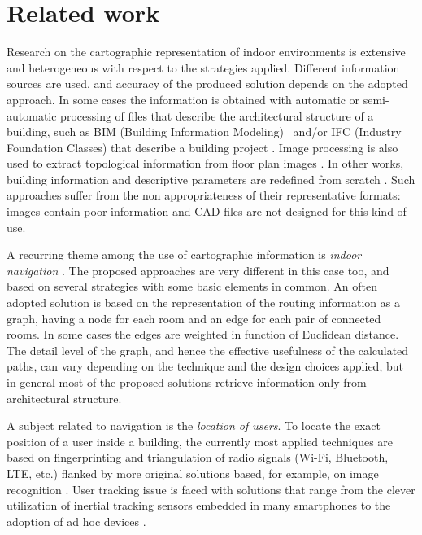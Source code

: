 \section{Related work}\label{related-work}

Research on the cartographic representation of indoor environments is
extensive and heterogeneous with respect to the strategies
applied. Different information sources are used, and accuracy of the
produced solution depends on the adopted approach. In some cases the
information is obtained with automatic or semi-automatic processing of files
that describe the architectural structure of a building, such as BIM (Building Information Modeling)~\cite{Eastman:2008:BHG:1796500} and/or IFC (Industry Foundation Classes) that describe a building project \cite{6816739}. Image processing is also used to
extract topological information from floor plan images \cite{6878152}. In
other works, building information and descriptive parameters are redefined
from scratch \cite{6418876}. Such approaches suffer from the non appropriateness of
their representative formats: images contain poor information and CAD
files are not designed for this kind of use. 

A recurring theme among the use
of cartographic information is \emph{indoor navigation}
\cite{6878152,6418876,6816739}. The proposed approaches are very different in
this case too, and based on several strategies with some basic elements in
common. An often adopted solution is based on the representation of the
routing information as a graph, having a node for each room and an edge for
each pair of connected rooms. In some cases the edges are weighted in
function of Euclidean distance. The detail level of the graph, and hence the
effective usefulness of the calculated paths, can vary depending on the
technique and the design choices applied, but in general most of the proposed
solutions retrieve information only from architectural structure. 

A subject related to navigation is the \emph{location of users}. To locate the exact position of a user inside a
building, the currently most applied techniques are based on fingerprinting and
triangulation of radio signals (Wi-Fi, Bluetooth, LTE, etc.) flanked by more
original solutions based, for example, on image recognition \cite{6815564}.
User tracking issue is faced with solutions that range from the clever
utilization of inertial tracking sensors embedded in many smartphones
\cite{6815564} to the adoption of ad hoc devices \cite{6878152}.

